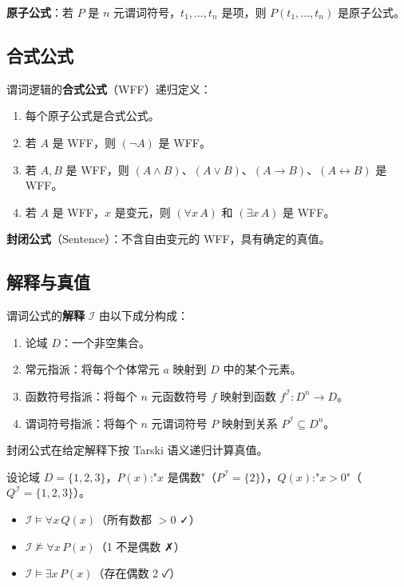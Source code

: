 \textbf{原子公式}：若 $P$ 是 $n$ 元谓词符号，$t_1,\dots,t_n$ 是项，则 $P(t_1,\dots,t_n)$ 是原子公式。

\subsection{合式公式}

谓词逻辑的\textbf{合式公式}（WFF）递归定义：
\begin{enumerate}
\item 每个原子公式是合式公式。
\item 若 $A$ 是 WFF，则 $(\neg A)$ 是 WFF。
\item 若 $A,B$ 是 WFF，则 $(A \land B)$、$(A \lor B)$、$(A \rightarrow B)$、$(A \leftrightarrow B)$ 是 WFF。
\item 若 $A$ 是 WFF，$x$ 是变元，则 $(\forall x \, A)$ 和 $(\exists x \, A)$ 是 WFF。
\end{enumerate}

\textbf{封闭公式}（Sentence）：不含自由变元的 WFF，具有确定的真值。

\subsection{解释与真值}

谓词公式的\textbf{解释} $\mathcal{I}$ 由以下成分构成：
\begin{enumerate}
\item 论域 $D$：一个非空集合。
\item 常元指派：将每个个体常元 $a$ 映射到 $D$ 中的某个元素。
\item 函数符号指派：将每个 $n$ 元函数符号 $f$ 映射到函数 $f^{\mathcal{I}}: D^n \rightarrow D$。
\item 谓词符号指派：将每个 $n$ 元谓词符号 $P$ 映射到关系 $P^{\mathcal{I}} \subseteq D^n$。
\end{enumerate}

封闭公式在给定解释下按 Tarski 语义递归计算真值。

\begin{example}
设论域 $D=\{1,2,3\}$，$P(x)$:"$x$ 是偶数"（$P^{\mathcal{I}}=\{2\}$），$Q(x)$:"$x>0$"（$Q^{\mathcal{I}}=\{1,2,3\}$）。
\begin{itemize}
\item $\mathcal{I} \models \forall x \, Q(x)$（所有数都 $>0$ ✓）
\item $\mathcal{I} \not\models \forall x \, P(x)$（1 不是偶数 ✗）
\item $\mathcal{I} \models \exists x \, P(x)$（存在偶数 2 ✓）
\end{itemize}
\end{example}

